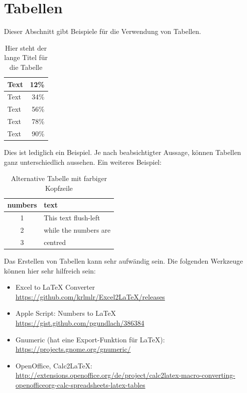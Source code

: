 

\section{Tabellen}
\label{sec:Tabellen}
Dieser Abschnitt gibt Beispiele für die Verwendung von Tabellen.

\begin{table}[ht]
    \vspace{0.5em}
	\centering
	\begin{tabular}{|l|r|}
        \hline
        Text & 12\% \\
        \hline
        Text & 34\% \\
        \hline
        Text & 56\% \\
        \hline
        Text & 78\% \\
        \hline
        Text & 90\% \\
        \hline
	\end{tabular}
	\caption[Kurztitel Tabelle]{Hier steht der lange Titel für die Tabelle}
	\label{tab:tabelle}
	\vspace{0.5em}
\end{table}

\noindent{}Dies ist lediglich ein Beispiel. Je nach beabsichtigter Aussage, können Tabellen ganz unterschiedlich aussehen. Ein weiteres Beispiel:

\begin{table}[ht]
    \vspace{0.5em}
	\centering
	\begin{tabular}{|c|l|}
		\hline
		\rowcolor[gray]{0.9}\textbf{numbers} & \textbf{text} \\
		\hline
		\hline
		1 & This text flush-left \\
		\hline
		2 & while the numbers are \\
		\hline
		3 & centred \\
		\hline
	\end{tabular}
	\caption[Alternative Tabelle]{Alternative Tabelle mit farbiger Kopfzeile}
	\label{tab:tablealternative}
	\vspace{0.5em}
\end{table}


Das Erstellen von Tabellen kann sehr aufwändig sein. Die folgenden Werkzeuge können hier sehr hilfreich sein:

\begin{itemize}
	\item Excel to \LaTeX{} Converter\\ \url{https://github.com/krlmlr/Excel2LaTeX/releases}
	\item Apple Script: Numbers to \LaTeX{} \\ \url{https://gist.github.com/pgundlach/386384}
	\item Gnumeric (hat eine Export-Funktion für \LaTeX{}): \\ \url{https://projects.gnome.org/gnumeric/}
	\item OpenOffice, Calc2LaTeX: \url{http://extensions.openoffice.org/de/project/calc2latex-macro-converting-openofficeorg-calc-spreadsheets-latex-tables}
\end{itemize}

